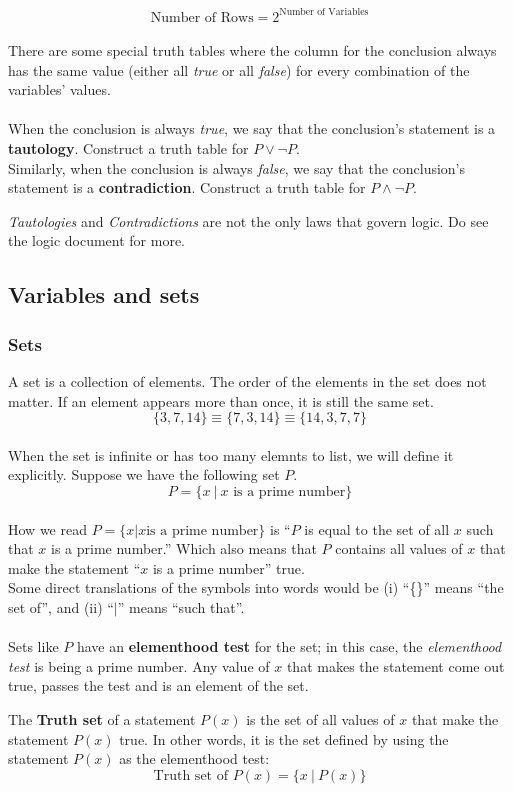 \documentclass[../setup.tex]{subfiles}
\begin{document}
\[ \text{Number of Rows} = 2^{\text{Number of Variables}} \]
\\
There are some special truth tables where the column for the conclusion always has the same value (either all \textit{true} or all \textit{false}) for every combination of the variables' values. \\
\\
When the conclusion is always \textit{true}, we say that the conclusion's statement is a \textbf{tautology}. Construct a truth table for $P\lor\lnot P$.\\
Similarly, when the conclusion is always \textit{false}, we say that the conclusion's statement is a \textbf{contradiction}. Construct a truth table for $P \land\lnot P$. \\

\begin{remark}
\textit{Tautologies} and \textit{Contradictions} are not the only laws that govern logic. Do see the logic document for more.
\end{remark}



\subsection{Variables and sets}
\subsubsection{Sets}
A set is a collection of elements. The order of the elements in the set does not matter. If an element appears more than once, it is still the same set. \\
\[ \{3, 7, 14\} \equiv \{7, 3, 14\} \equiv \{14, 3, 7, 7\} \]
\\
When the set is infinite or has too many elemnts to list, we will define it explicitly. Suppose we have the following set $P$. \\

\[ P = \{x \ |\  x \text{ is a prime number}\} \]
\\
How we read $P = \{x | x \text{is a prime number}\}$ is ``$P$ is equal to the set of all $x$ such that $x$ is a prime number.'' Which also means that $P$ contains all values of $x$ that make the statement ``$x$ is a prime number'' true. \\
Some direct translations of the symbols into words would be (i) ``\{\}'' means ``the set of'', and (ii) ``$|$'' means ``such that''. \\
\\
Sets like $P$ have an \textbf{elementhood test} for the set; in this case, the \textit{elementhood test} is being a prime number. Any value of $x$ that makes the statement come out true, passes the test and is an element of the set. \\
\begin{theorem}
The \textbf{Truth set} of a statement $P(x)$ is the set of all values of $x$ that make the statement $P(x)$ true. In other words, it is the set defined by using the statement $P(x)$ as the elementhood test: \\
\[ \text{Truth set of } P(x) = \{x \ | \ P(x)\} \]
\end{theorem}
\end{document}

